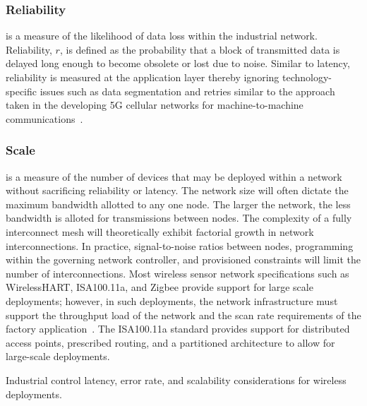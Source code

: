     \subsubsection{Reliability} is a measure of the likelihood of data loss within the industrial network.  Reliability, $r$, is defined as the probability that a block of transmitted data is delayed long enough to become obsolete or lost due to noise.  Similar to latency, reliability is measured at the application layer thereby ignoring technology-specific issues such as data segmentation and retries similar to the approach taken in the developing 5G cellular networks for machine-to-machine communications~\cite{Holfeld2016}.
    
    \subsubsection{Scale} is a measure of the number of devices that may be deployed within a network without sacrificing reliability or latency. The network size will often dictate the maximum bandwidth allotted to any one node.  The larger the network, the less bandwidth is alloted for transmissions between nodes.  The complexity of a fully interconnect mesh will theoretically exhibit factorial growth in network interconnections.  In practice, signal-to-noise ratios between nodes, programming within the governing network controller, and provisioned constraints will limit the number of interconnections.  Most wireless sensor network specifications such as WirelessHART, ISA100.11a, and Zigbee provide support for large scale deployments; however, in such deployments, the network infrastructure must support the throughput load of the network and the scan rate requirements of the factory application~\cite{Wang7448365}.  The ISA100.11a standard provides support for distributed access points, prescribed routing, and a partitioned architecture to allow for large-scale deployments.

\begin{table}[!t]
	\centering
	\caption{Industrial control latency, error rate, and scalability considerations for wireless deployments.}
	\label{tbl:techreqs}
	
\end{table}%

